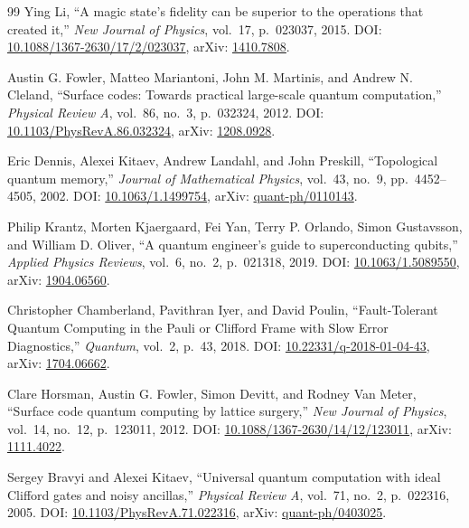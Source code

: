 \begin{thebibliography}{99}
Ying Li, ``A magic state's fidelity can be superior to the operations that created it,'' \emph{New Journal of Physics}, vol.~17, p.~023037, 2015. DOI: \href{https://doi.org/10.1088/1367-2630/17/2/023037}{10.1088/1367-2630/17/2/023037}, arXiv: \href{https://arxiv.org/abs/1410.7808}{1410.7808}.

Austin G. Fowler, Matteo Mariantoni, John M. Martinis, and Andrew N. Cleland, ``Surface codes: Towards practical large-scale quantum computation,'' \emph{Physical Review A}, vol.~86, no.~3, p.~032324, 2012. DOI: \href{https://doi.org/10.1103/PhysRevA.86.032324}{10.1103/PhysRevA.86.032324}, arXiv: \href{https://arxiv.org/abs/1208.0928}{1208.0928}.

Eric Dennis, Alexei Kitaev, Andrew Landahl, and John Preskill, ``Topological quantum memory,'' \emph{Journal of Mathematical Physics}, vol.~43, no.~9, pp.~4452--4505, 2002. DOI: \href{https://doi.org/10.1063/1.1499754}{10.1063/1.1499754}, arXiv: \href{https://arxiv.org/abs/quant-ph/0110143}{quant-ph/0110143}.

Philip Krantz, Morten Kjaergaard, Fei Yan, Terry P. Orlando, Simon Gustavsson, and William D. Oliver, ``A quantum engineer's guide to superconducting qubits,'' \emph{Applied Physics Reviews}, vol.~6, no.~2, p.~021318, 2019. DOI: \href{https://doi.org/10.1063/1.5089550}{10.1063/1.5089550}, arXiv: \href{https://arxiv.org/abs/1904.06560}{1904.06560}.

Christopher Chamberland, Pavithran Iyer, and David Poulin, ``Fault-Tolerant Quantum Computing in the Pauli or Clifford Frame with Slow Error Diagnostics,'' \emph{Quantum}, vol.~2, p.~43, 2018. DOI: \href{https://doi.org/10.22331/q-2018-01-04-43}{10.22331/q-2018-01-04-43}, arXiv: \href{https://arxiv.org/abs/1704.06662}{1704.06662}.

Clare Horsman, Austin G. Fowler, Simon Devitt, and Rodney Van Meter, ``Surface code quantum computing by lattice surgery,'' \emph{New Journal of Physics}, vol.~14, no.~12, p.~123011, 2012. DOI: \href{https://doi.org/10.1088/1367-2630/14/12/123011}{10.1088/1367-2630/14/12/123011}, arXiv: \href{https://arxiv.org/abs/1111.4022}{1111.4022}.

Sergey Bravyi and Alexei Kitaev, ``Universal quantum computation with ideal Clifford gates and noisy ancillas,'' \emph{Physical Review A}, vol.~71, no.~2, p.~022316, 2005. DOI: \href{https://doi.org/10.1103/PhysRevA.71.022316}{10.1103/PhysRevA.71.022316}, arXiv: \href{https://arxiv.org/abs/quant-ph/0403025}{quant-ph/0403025}.


\end{thebibliography}
